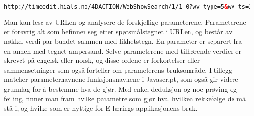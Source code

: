 \documentclass[../main.tex]{subfiles}
\begin{document}
\begin{lstlisting}[language=HTML, frame=single, caption={En URL generert når man søker etter en timeplan for ett spesifikt fag}]
http://timeedit.hials.no/4DACTION/WebShowSearch/1/1-0?wv_type=5&wv_ts=20130511T191704X3729&wv_search=&wv_startWeek=1301&wv_stopWeek=1318&wv_first=0&wv_addObj=&wv_delObj=&wv_obj1=174000&wv_text=Tekstformat
\end{lstlisting}

Man kan lese av URLen og analysere de forskjellige parameterene. Parameterene er forøvrig alt som befinner seg etter spørsmålstegnet i URLen, og består av nøkkel-verdi par bundet sammen med likhetstegn. En parameter er separert fra en annen med tegnet ampersand. Selve parameterene med tilhørende verdier er skrevet på engelsk eller norsk, og disse ordene er forkortelser eller sammensetninger som også forteller om parameterens bruksområde.  I tillegg matcher parameternavnene funksjonsnavnene i Javascript, som også gir videre grunnlag for å bestemme hva de gjør. Med enkel deduksjon og noe prøving og feiling, finner man fram hvilke parametre som gjør hva, hvilken rekkefølge de må stå i, og hvilke som er nyttige for E-lærings-applikasjonens bruk.
\end{document}
